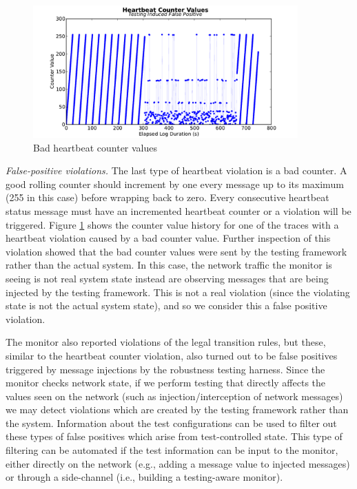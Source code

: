 \begin{figure}[htbp]
\centering
\includegraphics[width=4.0in]{img/hb2}
\caption{Bad heartbeat counter values \label{fig:hb_badcounter}}
\end{figure}

\textit{False-positive violations.}
The last type of heartbeat violation is a bad counter.
A good rolling counter should increment by one every message up to its maximum (255 in this case) before wrapping back to zero.
Every consecutive heartbeat status message must have an incremented heartbeat counter or a violation will be triggered. Figure \ref{fig:hb_badcounter} shows the counter value history for one of the traces with a heartbeat violation caused by a bad counter value.
%
Further inspection of this violation showed that the bad counter values were sent by the testing framework rather than the actual system. In this case, the network traffic the monitor is seeing is not real system state
instead are observing
messages that are being injected by the testing framework.
This is not a real violation (since the violating state is not the actual system state),
and so we consider this a false positive violation.



The monitor also reported violations of the legal transition rules, but these, similar to the heartbeat counter violation, also turned out to be false positives triggered by message injections by the robustness testing harness. Since the monitor checks network state, if we perform testing that directly affects the values seen on the network (such as injection/interception of network messages) we may detect violations which are created by the testing framework rather than the system.
Information about the test configurations can be used to filter out these types of false positives which arise from test-controlled state.
This type of filtering can be automated if the test information can be input to the monitor, either directly on the network (e.g., adding a message value to injected messages) or through a side-channel (i.e., building a testing-aware monitor).
